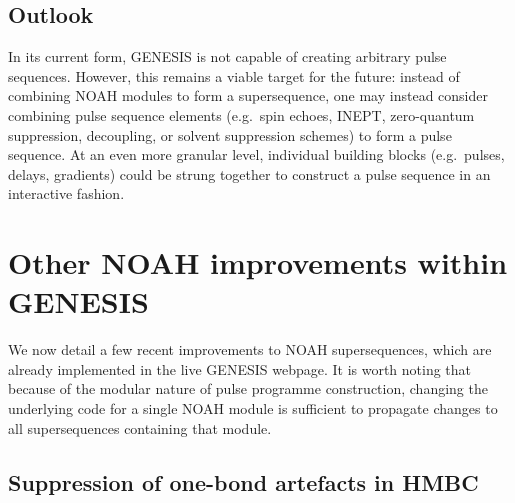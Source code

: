 \documentclass[a4paper,11pt]{article}
\begin{document}
\begin{refsection}
\subsection{Outlook}
\label{subsec:outlook}

In its current form, GENESIS is not capable of creating arbitrary pulse sequences.
However, this remains a viable target for the future: instead of combining NOAH modules to form a supersequence, one may instead consider combining pulse sequence elements (e.g.\ spin echoes, INEPT, zero-quantum suppression, decoupling, or solvent suppression schemes) to form a pulse sequence.
At an even more granular level, individual building blocks (e.g.\ pulses, delays, gradients) could be strung together to construct a pulse sequence in an interactive fashion.


\section{Other NOAH improvements within GENESIS}

We now detail a few recent improvements to NOAH supersequences, which are already implemented in the live GENESIS webpage.
It is worth noting that because of the modular nature of pulse programme construction, changing the underlying code for a single NOAH module is sufficient to propagate changes to all supersequences containing that module.

\subsection{Suppression of one-bond artefacts in HMBC}


\end{refsection}
\end{document}
